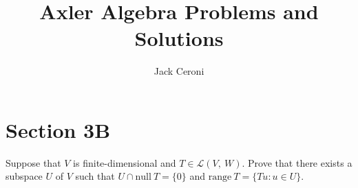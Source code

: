 \documentclass[10pt, oneside]{article}
\title{Axler Algebra Problems and Solutions}
\author{Jack Ceroni}
\date{}
\newenvironment{problem}[2][Problem]{\begin{trivlist}
\item[\hskip \labelsep {\bfseries #1}\hskip \labelsep {\bfseries #2.}]}{\end{trivlist}}
\begin{document}
    \maketitle
    \tableofcontents

    \vspace{.25in}

    \newpage

    \section{Section 3B}

    \begin{problem}{3.12}

      Suppose that $V$ is finite-dimensional and $T \in \mathcal{L}(V, \ W)$. Prove that there exists a subspace
      $U$ of $V$ such that $U \cap \text{null} \ T = \{0\}$ and $\text{range} \ T = \{Tu : u \in U\}$.

      \end{problem}
\end{document}
